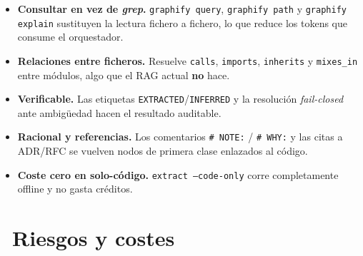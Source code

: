\documentclass[11pt,a4paper]{article}
\newcommand{\iconotexto}[2]{\textcolor{cyanNeon}{\faIcon{#1}}~#2}
\begin{document}
\begin{itemize}[leftmargin=1.4em]
    \item \textbf{Consultar en vez de \emph{grep}.} \texttt{graphify query},
    \texttt{graphify path} y \texttt{graphify explain} sustituyen la lectura fichero a
    fichero, lo que reduce los tokens que consume el orquestador.
    \item \textbf{Relaciones entre ficheros.} Resuelve \texttt{calls}, \texttt{imports},
    \texttt{inherits} y \texttt{mixes\_in} entre módulos, algo que el RAG actual
    \textbf{no} hace.
    \item \textbf{Verificable.} Las etiquetas \texttt{EXTRACTED}/\texttt{INFERRED} y la
    resolución \emph{fail-closed} ante ambigüedad hacen el resultado auditable.
    \item \textbf{Racional y referencias.} Los comentarios \texttt{\# NOTE:} / \texttt{\# WHY:}
    y las citas a ADR/RFC se vuelven nodos de primera clase enlazados al código.
    \item \textbf{Coste cero en solo-código.} \texttt{extract --code-only} corre
    completamente offline y no gasta créditos.
\end{itemize}

\section[Riesgos y Costes]{\iconotexto{shield-alt}{Riesgos y costes}}
\end{document}
